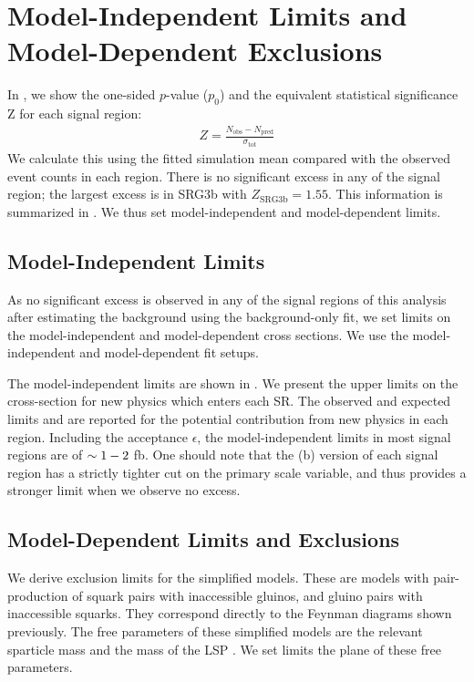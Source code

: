 \section{Model-Independent Limits and Model-Dependent Exclusions}

In , we show the one-sided $p$-value ($p_0$) and the equivalent statistical significance Z for each signal region:
\begin{align}
Z = \frac{N_{\mathrm{obs}} - N_{\mathrm{pred}}}{\sigma_{\mathrm{tot}}}
\end{align}
We calculate this using the fitted simulation mean compared with the observed event counts in each region.
There is no significant excess in any of the signal region; the largest excess is in SRG3b with $Z_{\text{SRG3b}} = 1.55$.
This information is summarized in .
We thus set model-independent and model-dependent limits.

\subsection{Model-Independent Limits}

As no significant excess is observed in any of the signal regions of this analysis after estimating the background using the background-only fit, we set limits on the model-independent and model-dependent cross sections.
We use the model-independent and model-dependent fit setups.

The model-independent limits are shown in .
We present the upper limits on the cross-section for new physics which enters each SR.
The observed and expected limits \sobs and \sexp are reported for the potential contribution from new physics in each region.
Including the acceptance $\epsilon$, the model-independent limits in most signal regions are of $\sim 1-2$ fb.
One should note that the (b) version of each signal region has a strictly tighter cut on the primary scale variable, and thus provides a stronger limit when we observe no excess.

\subsection{Model-Dependent Limits and Exclusions}

We derive exclusion limits for the simplified models.
These are models with pair-production of squark pairs with inaccessible gluinos, and gluino pairs with inaccessible squarks.
They correspond directly to the Feynman diagrams shown previously.
The free parameters of these simplified models are the relevant sparticle mass and the mass of the LSP \lsp.
We set limits the plane of these free parameters.

